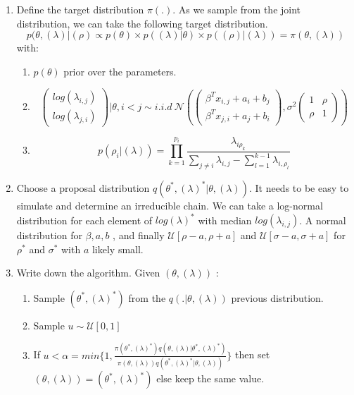 \documentclass[12pt]{ociamthesis}  %
\begin{document}
	\begin{enumerate}
	
	\item Define the target distribution $\pi(.)$. As we sample from the joint distribution, we can take the following target distribution.
	\begin{equation}
	p(\theta, (\lambda)|(\rho) \propto p(\theta) \times p((\lambda) | \theta)\times p((\rho)|(\lambda)) = \pi(\theta, (\lambda))
	\end{equation}
	with:
	\begin{enumerate}
	\item $p(\theta)$ prior over the parameters.
	\item
	\begin{equation}
	\begin{pmatrix}
	log(\lambda_{i,j}) \\
	log(\lambda_{j,i})
	\end{pmatrix}
	|\theta , i < j \sim i.i.d \  \mathcal{N} (\begin{pmatrix} \beta^{T}x_{i,j} + a_{i} + b_{j} \\  \beta^{T}x_{j,i} + a_{j} + b_{i} \end{pmatrix}, \sigma^{2} \begin{pmatrix} 1 & \rho \\ \rho & 1 \end{pmatrix})
	\end{equation}
	\item 
	\begin{equation}
	p(\rho_{i} | (\lambda)) = \prod_{k = 1}^{p_{i}}\frac{\lambda_{i\rho_{k}}}{\sum_{j \neq i}\lambda_{i,j} - \sum_{l = 1}^{k - 1}\lambda_{i,\rho_{l}}  }
	\end{equation}
	\end{enumerate}
	\item Choose a proposal distribution $q(\theta^{*}, (\lambda)^{*} |\theta, (\lambda))$. It needs to be easy to simulate and determine an irreducible chain. We can take a log-normal distribution for each element of $log(\lambda)^{*}$ with median $log(\lambda_{i,j})$. A normal distribution for \boldmath $\beta, a, b$ \unboldmath, and finally $\mathcal{U}[\rho - a, \rho + a]$ and $\mathcal{U}[\sigma - a, \sigma + a]$ for $\rho^{*}$ and $\sigma^{*}$ with $a$ likely small.
	\item Write down the algorithm. Given $(\theta, (\lambda))$ :
	\begin{enumerate}
	\item Sample $(\theta^{*}, (\lambda)^{*})$ from the $q(.|\theta, (\lambda))$ previous distribution.
	\item Sample $u \sim \mathcal{U}[0,1]$
	\item If $u < \alpha = min\{ 1, \frac{\pi(\theta^{*}, (\lambda)^{*})q(\theta, (\lambda) |\theta^{*}, (\lambda)^{*})}{\pi(\theta, (\lambda))q(\theta^{*}, (\lambda)^{*} |\theta, (\lambda))}   \}$ then set $(\theta, (\lambda)) = (\theta^{*}, (\lambda)^{*})$ else keep the same value.
	\end{enumerate}
	\end{enumerate}
\end{document}
